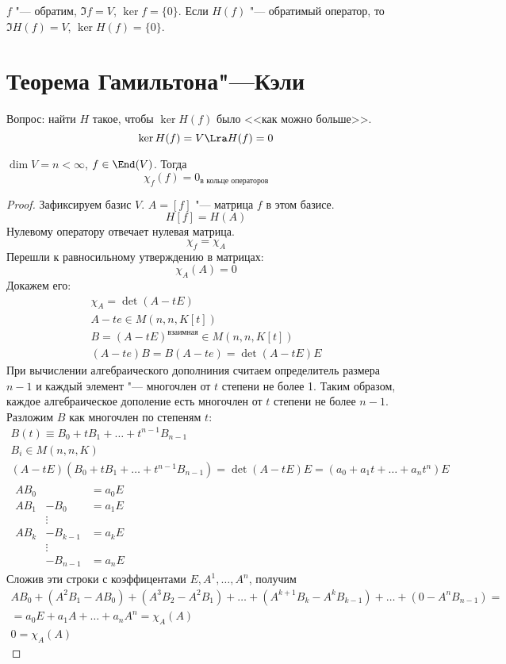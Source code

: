 \begin{Rem}
	$f$ "--- обратим, $\Im f = V$, $\ker f = \{0\}$.
	Если $H(f)$ "--- обратимый оператор, то $\Im H(f) = V$, $\ker H(f) = \{0\}$.
\end{Rem}

\section{Теорема Гамильтона"---Кэли}

Вопрос: найти $H$ такое, чтобы $\ker H(f)$ было <<как можно больше>>.
\[ \ker H(f) = V \Lra H(f) = 0 \]
\begin{theorem}
	$\dim V = n < \infty$, $f \in \End(V)$.
	Тогда
	\[ \chi_f(f) = 0_{\text{в кольце операторов}} \]
\end{theorem}
\begin{proof}
	Зафиксируем базис $V$.
	$A = [f]$ "--- матрица $f$ в этом базисе.
	\[ H[f] = H(A) \]
	Нулевому оператору отвечает нулевая матрица.
	\[ \chi_f = \chi_A \]
	Перешли к равносильному утверждению в матрицах:
	\[ \chi_A (A) = 0 \]
	Докажем его:
	\begin{gather*}
		\chi_A = \det (A - tE) \\
		A - te \in M(n, n, K[t]) \\
		B = (A - tE)^{\text{взаимная}} \in M(n, n, K[t]) \\
		(A - te) B = B(A - te) = \det (A - tE) E
	\end{gather*}
	При вычислении алгебраического дополниния считаем определитель размера $n - 1$ и каждый элемент "--- многочлен от $t$ степени не более 1.
	Таким образом, каждое алгебраическое дополение есть многочлен от $t$ степени не более $n - 1$.
	Разложим $B$ как многочлен по степеням $t$:
	\begin{gather*}
		B(t) \equiv B_0 + t B_1 + \dots + t^{n-1} B_{n-1} \\
		B_i \in M(n, n, K) \\
		(A - tE)(B_0 + t B_1 + \dots + t^{n-1} B_{n-1}) = \det (A - tE) E = (a_0 + a_1 t + \dots + a_n t^n) E \\
		\begin{alignedat}{3}
			AB_0 &      &= a_0 E \\
			AB_1 &- B_0 &= a_1 E \\
			&\vdots \\
			AB_k &- B_{k-1} &= a_k E \\
			&\vdots \\
			     &- B_{n-1} &= a_n E
		\end{alignedat}
	\end{gather*}
	Сложив эти строки с коэффицентами $E, A^1, \dots, A^n$, получим
	\begin{gather*}
		AB_0 + (A^2 B_1 - AB_0) + (A^3 B_2 - A^2B_1) + \dots + (A^{k+1} B_k - A^kB_{k-1}) + \dots + (0 - A^nB_{n-1}) = \\
		= a_0 E + a_1 A + \dots + a_n A^n = \chi_A(A) \\
		0 = \chi_A(A)
	\end{gather*}
\end{proof}

